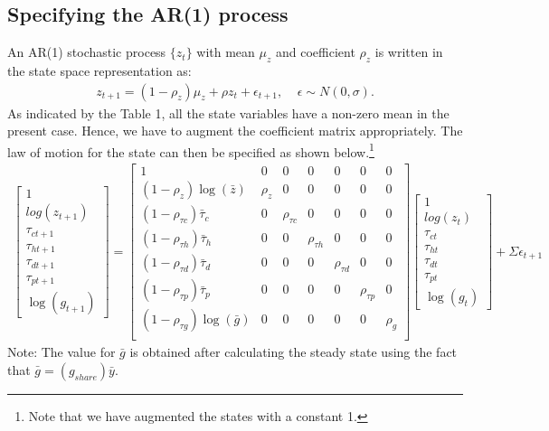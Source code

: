 \documentclass[12pt]{article}
\begin{document}
\subsection{Specifying the AR(1) process}
An AR(1) stochastic process $\{z_t\}$ with mean $\mu_z$ and coefficient $\rho_z$ is written in the state space representation as:
\begin{align*}
	z_{t+1} = (1-\rho_z)\mu_z + \rho z_t + \epsilon_{t+1}, \; \; \; \; \epsilon\sim N(0, \sigma).
\end{align*}
As indicated by the Table 1, all the state variables have a non-zero mean in the present case. Hence, we have to augment the coefficient matrix appropriately. The law of motion for the state can then be specified as shown below.\footnote{Note that we have augmented the states with a constant 1.}
\begin{align*}
	\begin{bmatrix}
		1 \\log (z_{t+1}) \\ \tau_{ct+1} \\ \tau_{ht+1} \\ \tau_{dt+1} \\ \tau_{pt+1} \\ \log (g_{t+1})
	\end{bmatrix} = \begin{bmatrix}
		1 & 0 & 0 & 0 & 0 & 0 & 0 \\
		(1-\rho_z)\log ( \bar z) & \rho_z & 0 & 0 & 0 & 0 & 0 \\
		(1-\rho_{\tau c})\bar \tau_c & 0 & \rho_{\tau c} & 0 & 0 & 0 & 0 \\
		(1-\rho_{\tau h})\bar \tau_h & 0  & 0 & \rho_{\tau h} & 0 & 0 & 0 \\
		(1-\rho_{\tau d})\bar \tau_d & 0  & 0  & 0 & \rho_{\tau d} & 0 & 0 \\
		(1-\rho_{\tau p})\bar \tau_p & 0  & 0  & 0  & 0 & \rho_{\tau p} & 0 \\
		(1-\rho_{\tau g})\log (\bar g) & 0  & 0  & 0  & 0 & 0 &\rho_{g}\\
	\end{bmatrix} 	\begin{bmatrix}
		1 \\log (z_{t}) \\ \tau_{ct} \\ \tau_{ht} \\ \tau_{dt} \\ \tau_{pt} \\ \log (g_{t})
	\end{bmatrix} + \Sigma\epsilon_{t+1}
\end{align*}
Note: The value for $\bar g$ is obtained after calculating the steady state using the fact that $\bar g = (g_{share}) \bar y$.
\end{document}
